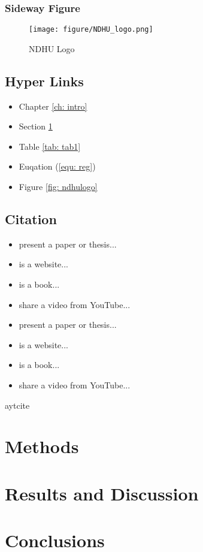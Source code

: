 \documentclass[12pt,a4paper,oneside]{book}
\begin{document}
\newpage
\subsection{Sideway Figure}
\label{fig: sideways}

\begin{sidewaysfigure}
\begin{figure}[H]
     \centering
     \texttt{[image: figure/NDHU\_logo.png]}
     \caption{NDHU Logo}
\end{figure}
\end{sidewaysfigure}

\newpage
\section{Hyper Links}
\label{sec: link}

\begin{itemize}
    \item Chapter \ref{ch: intro}
    \item Section \ref{sec: link}
    \item Table \ref{tab: tab1}
    \item Euqation (\ref{equ: reg})
    \item Figure \ref{fig: ndhulogo}
\end{itemize}

\section{Citation}

\begin{itemize}
    \item \cite{lu2023art} present a paper or thesis...
    \item \cite{lu2023misc} is a website...
    \item \cite{lu2023book} is a book...
    \item \cite{lu2023online} share a video from YouTube...
    \item {} present a paper or thesis...
    \item {} is a website...
    \item {} is a book...
    \item {} share a video from YouTube...
\end{itemize}

aytcite

\chapter{Methods}

\chapter{Results and Discussion}

\chapter{Conclusions}

\newpage

\printbibliography[title={References}, heading=bibintoc]

\newpage

\appendix 
\chapter{}
\end{document}
